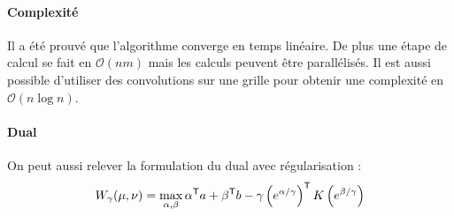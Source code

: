\paragraph{Complexité}
Il a été prouvé que l'algorithme converge en temps linéaire. De plus une étape de calcul se fait en $\mathcal{O}(nm)$ mais les calculs peuvent être parallélisés. Il est aussi possible d'utiliser des convolutions sur une grille pour obtenir une complexité en $\mathcal{O}(n \log n)$.

\paragraph{Dual}
On peut aussi relever la formulation du dual avec régularisation :
$$ W_\gamma(\mu, \nu) = \max_{\alpha, \beta} \alpha^{\mathsf{T}} a + \beta^{\mathsf{T}} b - \gamma \left( e^{\alpha / \gamma} \right)^{\mathsf{T}} K \left( e^{\beta / \gamma} \right) $$